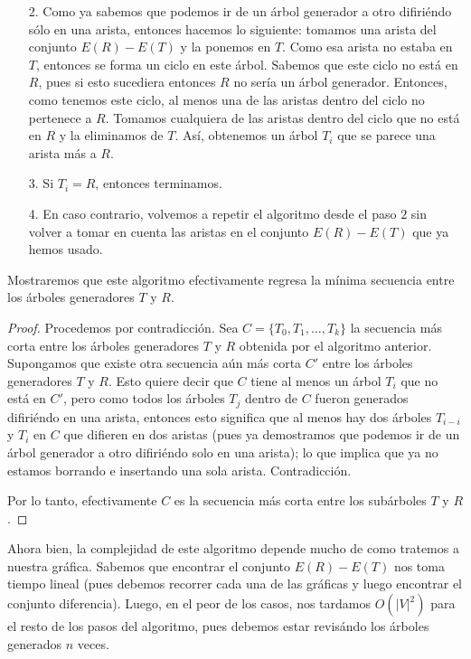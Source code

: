 \documentclass[letterpaper,11pt]{article}
\begin{document}
\begin{enumerate}
\begin{itemize}
        \item[2.] Como ya sabemos que podemos ir de un árbol generador a otro 
        difiriéndo sólo en una arista, entonces hacemos lo siguiente: tomamos 
        una arista del conjunto $E(R) - E(T)$ y la ponemos en $T$. Como esa 
        arista no estaba en $T$, entonces se forma un ciclo en este árbol. 
        Sabemos que este ciclo no está en $R$, pues si esto sucediera entonces 
        $R$ no sería un árbol generador. Entonces, como tenemos este ciclo,
        al menos una de las aristas dentro del ciclo no pertenece a $R$. 
        Tomamos cualquiera de las aristas dentro del ciclo que no está en $R$
        y la eliminamos de $T$. Así, obtenemos un árbol $T_i$ que se parece 
        una arista más a $R$.

        \item[3.] Si $T_i = R$, entonces terminamos.

        \item[4.] En caso contrario, volvemos a repetir el algoritmo desde el 
        paso $2$  sin volver a tomar en cuenta las aristas en el conjunto 
        $E(R) - E(T)$ que ya hemos usado.  
    \end{itemize}

    Mostraremos que este algoritmo efectivamente regresa la mínima 
    secuencia entre los árboles generadores $T$ y $R$.
    \begin{proof}
        Procedemos por contradicción. Sea $C = \{T_0, T_1, \ldots, T_k\}$ la 
        secuencia más corta entre los árboles generadores $T$ y $R$ 
        obtenida por el algoritmo anterior. Supongamos que existe otra 
        secuencia aún más corta $C'$ entre los árboles generadores $T$ y $R$. 
        Esto quiere decir que $C$ tiene al menos un árbol $T_i$ que no está 
        en $C'$, pero como todos los árboles $T_j$ dentro de $C$ fueron 
        generados difiriéndo en una arista, entonces esto significa que al 
        menos hay dos árboles $T_{i-i}$ y $T_i$ en $C$ que difieren en dos 
        aristas (pues ya demostramos que podemos ir de un árbol generador 
        a otro difiriéndo solo en una arista); lo que implica que ya no 
        estamos borrando e insertando una sola arista. Contradicción.
        
        Por lo tanto, efectivamente $C$ es la secuencia más corta entre los 
        subárboles $T$ y $R$.

    \end{proof}

    Ahora bien, la complejidad de este algoritmo depende mucho de como 
    tratemos a nuestra gráfica. Sabemos que encontrar el conjunto $E(R) - E(T)$
    nos toma tiempo lineal (pues debemos recorrer cada una de las gráficas y 
    luego encontrar el conjunto diferencia). Luego, en el peor de los casos, 
    nos tardamos $O(|V|^2)$ para el resto de los pasos del algoritmo, pues 
    debemos estar revisándo los árboles generados $n$ veces. 


\end{enumerate}
\end{document}
